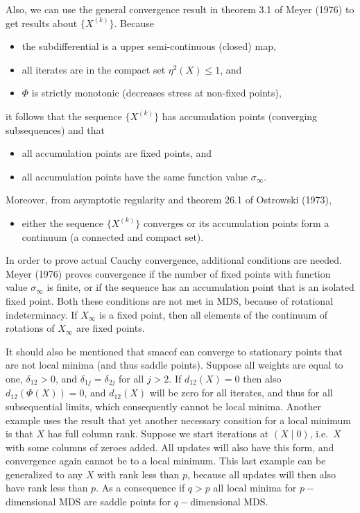 \documentclass[
  12pt,
]{article}
\providecommand{\tightlist}{%
  \setlength{\itemsep}{0pt}\setlength{\parskip}{0pt}}
\begin{document}
Also, we can use the general convergence result in theorem 3.1 of Meyer (1976)
to get results about \(\{X^{(k)}\}\). Because

\begin{itemize}
\tightlist
\item
  the subdifferential is a upper semi-continuous (closed) map,
\item
  all iterates are in the compact set \(\eta^2(X)\leq 1\), and
\item
  \(\Phi\) is strictly monotonic (decreases stress at non-fixed points),
\end{itemize}

it follows that the sequence \(\{X^{(k)}\}\) has accumulation points
(converging subsequences) and that

\begin{itemize}
\tightlist
\item
  all accumulation points are fixed points, and
\item
  all accumulation points have the same function value \(\sigma_\infty\).
\end{itemize}

Moreover, from asymptotic regularity and theorem 26.1 of Ostrowski (1973),

\begin{itemize}
\tightlist
\item
  either the sequence \(\{X^{(k)}\}\) converges or its accumulation points form a continuum
  (a connected and compact set).
\end{itemize}

In order to prove actual Cauchy convergence, additional conditions are needed.
Meyer (1976) proves convergence if the number of fixed points with function value \(\sigma_\infty\) is finite, or if the sequence has an accumulation point that is an isolated fixed point. Both these conditions are not met in MDS, because of rotational indeterminacy. If \(X_\infty\) is a fixed point, then all elements of the continuum of rotations of \(X_\infty\) are fixed points.

It should also be mentioned that smacof can converge to stationary points that
are not local minima (and thus saddle points). Suppose all weights are equal to one,
\(\delta_{12}>0\), and \(\delta_{1j}=\delta_{2j}\) for all \(j>2\). If \(d_{12}(X)=0\) then also
\(d_{12}(\Phi(X))=0\), and \(d_{12}(X)\) will be zero for all iterates, and thus for all subsequential limits, which consequently cannot be local minima. Another example
uses the result that yet another necessary consition for a local minimum is that \(X\) has full column rank. Suppose we start iterations at \((X\mid 0)\), i.e.~\(X\) with some columns of zeroes added. All
updates will also have this form, and convergence again cannot be to a local minimum.
This last example can be generalized to any \(X\) with rank less than \(p\), because
all updates will then also have rank less than \(p\). As a consequence if \(q>p\)
all local minima for \(p-\)dimensional MDS are saddle points for \(q-\)dimensional MDS.
\end{document}
